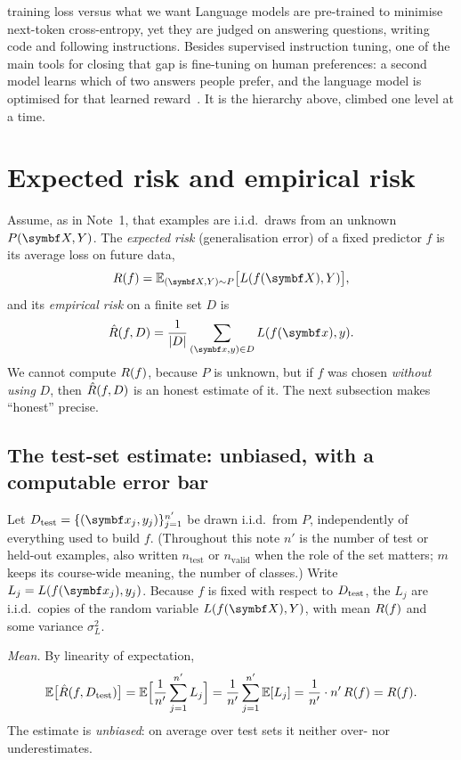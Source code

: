 \documentclass[11pt]{article}
\begin{document}
\begin{modern}{training loss versus what we want}
Language models are pre-trained to minimise next-token cross-entropy, yet they are judged on answering questions,
writing code and following instructions. Besides supervised instruction tuning, one of the main tools for closing that
gap is fine-tuning on human preferences: a second model learns which of two answers people prefer, and the language
model is optimised for that learned reward~\cite{ouyang2022}. It is the hierarchy above, climbed one level at a time.
\end{modern}

\section{Expected risk and empirical risk}\label{sec:risk}

Assume, as in Note~1, that examples are i.i.d.\ draws from an unknown $P(\X, Y)$. The \emph{expected risk}
(generalisation error) of a fixed predictor $f$ is its average loss on future data,
\[
  \Risk(f) = \E_{(\X, Y) \sim P}\big[L(f(\X), Y)\big],
\]
and its \emph{empirical risk} on a finite set $D$ is
\[
  \ERisk(f, D) = \frac{1}{|D|}\sum_{(\x, y) \in D} L(f(\x), y).
\]
We cannot compute $R(f)$, because $P$ is unknown, but if $f$ was chosen \emph{without using} $D$, then
$\hat R(f, D)$ is an honest estimate of it. The next subsection makes ``honest'' precise.

\subsection{The test-set estimate: unbiased, with a computable error bar}\label{sec:unbiased}

Let $\Dtest = \{(\x_j, y_j)\}_{j=1}^{n'}$ be drawn i.i.d.\ from $P$, independently of everything used to build $f$.
(Throughout this note $n'$ is the number of test or held-out examples, also written $n_{\mathrm{test}}$ or
$n_{\mathrm{valid}}$ when the role of the set matters; $m$ keeps its course-wide meaning, the number
of classes.)
Write $L_j = L(f(\x_j), y_j)$. Because $f$ is fixed with respect to $D_{\mathrm{test}}$, the $L_j$ are i.i.d.\ copies of the
random variable $L(f(\X), Y)$, with mean $R(f)$ and some variance $\sigma_L^2$.

\emph{Mean.} By linearity of expectation,
\[
  \mathbb{E}\big[\hat R(f, D_{\mathrm{test}})\big] = \mathbb{E}\Big[\frac{1}{n'} \sum_{j=1}^{n'} L_j\Big] = \frac{1}{n'} \sum_{j=1}^{n'} \mathbb{E}[L_j]
  = \frac{1}{n'} \cdot n'\,R(f) = R(f) .
\]
The estimate is \emph{unbiased}: on average over test sets it neither over- nor underestimates.
\end{document}
